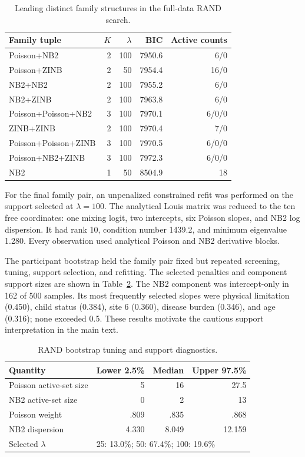 \documentclass{article}
\begin{document}
\begin{table}[htbp]
\centering
\caption{Leading distinct family structures in the full-data RAND search.}
\label{tab:supp_rand_full}
\small
\begin{tabular}{lrrrr}
\toprule
Family tuple & \(K\) & \(\lambda\) & BIC & Active counts \\
\midrule
Poisson+NB2 & 2 & 100 & 7950.6 & 6/0 \\
Poisson+ZINB & 2 & 50 & 7954.4 & 16/0 \\
NB2+NB2 & 2 & 100 & 7955.2 & 6/0 \\
NB2+ZINB & 2 & 100 & 7963.8 & 6/0 \\
Poisson+Poisson+NB2 & 3 & 100 & 7970.1 & 6/0/0 \\
ZINB+ZINB & 2 & 100 & 7970.4 & 7/0 \\
Poisson+Poisson+ZINB & 3 & 100 & 7970.5 & 6/0/0 \\
Poisson+NB2+ZINB & 3 & 100 & 7972.3 & 6/0/0 \\
NB2 & 1 & 50 & 8504.9 & 18 \\
\bottomrule
\end{tabular}
\end{table}

For the final family pair, an unpenalized constrained refit was performed on
the support selected at \(\lambda=100\).  The analytical Louis matrix was
reduced to the ten free coordinates: one mixing logit, two intercepts, six
Poisson slopes, and NB2 log dispersion.  It had rank 10, condition number
1439.2, and minimum eigenvalue 1.280.  Every observation used analytical
Poisson and NB2 derivative blocks.

The participant bootstrap held the family pair fixed but repeated screening,
tuning, support selection, and refitting.  The selected penalties and
component support sizes are shown in Table~\ref{tab:supp_rand_bootdiag}.  The
NB2 component was intercept-only in 162 of 500 samples.  Its most frequently
selected slopes were physical limitation (0.450), child status (0.384), site 6
(0.360), disease burden (0.346), and age (0.316); none exceeded 0.5.  These
results motivate the cautious support interpretation in the main text.

\begin{table}[htbp]
\centering
\caption{RAND bootstrap tuning and support diagnostics.}
\label{tab:supp_rand_bootdiag}
\small
\begin{tabular}{lrrr}
\toprule
Quantity & Lower 2.5\% & Median & Upper 97.5\% \\
\midrule
Poisson active-set size & 5 & 16 & 27.5 \\
NB2 active-set size & 0 & 2 & 13 \\
Poisson weight & .809 & .835 & .868 \\
NB2 dispersion & 4.330 & 8.049 & 12.159 \\
\midrule
Selected \(\lambda\) & \multicolumn{3}{l}{25: 13.0\%; 50: 67.4\%; 100: 19.6\%} \\
\bottomrule
\end{tabular}
\end{table}



\end{document}
